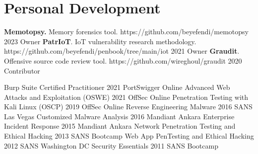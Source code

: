 

\section{Personal Development}

    
        \cvItem
            {\textbf{Memotopsy.} Memory forensics tool.}
            {https://github.com/beyefendi/memotopsy}
            {2023}
            {Owner}
            {}
        \cvItem
            {\textbf{PatrIoT}. IoT vulnerability research methodology.}
            {https://github.com/beyefendi/penbook/tree/main/iot}
            {2021}
            {Owner}
            {}
        \cvItem
            {\textbf{Graudit}. Offensive source code review tool.}
            {https://github.com/wireghoul/graudit}
            {2020}
            {Contributor}
            {}
            
    \itemizeCVEnd

  
        
        \cvItem
            {Burp Suite Certified Practitioner}
            {}
            {2021}
            {PortSwigger}
            {Online}
        \cvItem
            {Advanced Web Attacks and Exploitation (OSWE)}
            {}
            {2021}
            {OffSec}
            {Online}
        \cvItem
            {Penetration Testing with Kali Linux (OSCP)}
            {}
            {2019}
            {OffSec}
            {Online}
        \cvItem
            {Reverse Engineering Malware}
            {}
            {2016}
            {SANS}
            {Las Vegas}
        \cvItem
            {Customized Malware Analysis}
            {}
            {2016}
            {Mandiant}
            {Ankara}
        \cvItem
            {Enterprise Incident Response}
            {}
            {2015}
            {Mandiant}
            {Ankara}
        \cvItem
            {Network Penetration Testing and Ethical Hacking}
            {}
            {2013}
            {SANS}
            {Bootcamp}
        \cvItem
            {Web App PenTesting and Ethical Hacking}
            {}
            {2012}
            {SANS}
            {Washington DC}        
        \cvItem
            {Security Essentials}
            {}
            {2011}
            {SANS}
            {Bootcamp}


